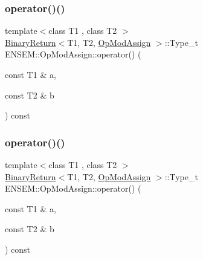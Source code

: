 \subsubsection{\texorpdfstring{operator()()}{operator()()}\hspace{0.1cm}{\footnotesize\ttfamily [1/3]}}
{\footnotesize\ttfamily template$<$class T1 , class T2 $>$ \\
\mbox{\hyperlink{structENSEM_1_1BinaryReturn}{Binary\+Return}}$<$T1, T2, \mbox{\hyperlink{structENSEM_1_1OpModAssign}{Op\+Mod\+Assign}} $>$\+::Type\+\_\+t E\+N\+S\+E\+M\+::\+Op\+Mod\+Assign\+::operator() (\begin{DoxyParamCaption}\item[{const T1 \&}]{a,  }\item[{const T2 \&}]{b }\end{DoxyParamCaption}) const\hspace{0.3cm}{\ttfamily [inline]}}

\mbox{\label{structENSEM_1_1OpModAssign_a3d9009924395ef97f9d281e378953c06}} 
\subsubsection{\texorpdfstring{operator()()}{operator()()}\hspace{0.1cm}{\footnotesize\ttfamily [2/3]}}
{\footnotesize\ttfamily template$<$class T1 , class T2 $>$ \\
\mbox{\hyperlink{structENSEM_1_1BinaryReturn}{Binary\+Return}}$<$T1, T2, \mbox{\hyperlink{structENSEM_1_1OpModAssign}{Op\+Mod\+Assign}} $>$\+::Type\+\_\+t E\+N\+S\+E\+M\+::\+Op\+Mod\+Assign\+::operator() (\begin{DoxyParamCaption}\item[{const T1 \&}]{a,  }\item[{const T2 \&}]{b }\end{DoxyParamCaption}) const\hspace{0.3cm}{\ttfamily [inline]}}

\mbox{\label{structENSEM_1_1OpModAssign_a3d9009924395ef97f9d281e378953c06}} 
